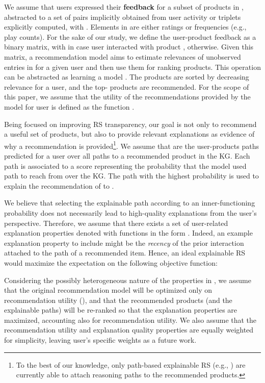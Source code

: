 \documentclass[sigconf]{acmart}
\begin{document}
We assume that users  expressed their \textbf{feedback} for a subset of products in , abstracted to a set of  pairs implicitly obtained from user activity or  triplets explicitly computed, with . 
Elements in  are either ratings or frequencies (e.g., play counts). 
For the sake of our study, we define the user-product feedback  as a binary matrix, with  in case user  interacted with product ,  otherwise. 
Given this matrix, a recommendation model aims to estimate relevances  of unobserved entries in  for a given user and then use them for ranking products. 
This operation can be abstracted as learning a model . 
The products are sorted by decreasing relevance for a user, and the top- products  are recommended.  
For the scope of this paper, we assume that the utility of the recommendations provided by the model for user  is defined as the function . 

Being focused on improving RS transparency, our goal is not only to recommend a useful set of products, but also to provide relevant explanations as evidence of why a recommendation is provided\footnote{To the best of our knowledge, only path-based explainable RS (e.g., \cite{XianFMMZ19}) are currently able to attach reasoning paths to the recommended products.}.
We assume that  are the user-products paths predicted for a user  over all paths to a recommended product  in the KG.  
Each path  is associated to a score  representing the probability that the model used path  to reach  from  over the KG. 
The path  with the highest probability  is used to explain the recommendation of  to .

We believe that selecting the explainable path  according to an inner-functioning probability does not necessarily lead to high-quality explanations from the user's perspective.
Therefore, we assume that there exists a set  of user-related explanation properties denoted with functions in the form .
Indeed, an example explanation property to include might be the \emph{recency} of the prior interaction attached to the path of a recommended item. 
Hence, an ideal explainable RS  would maximize the expectation on the following objective function:

\vspace{-2mm}


Considering the possibly heterogeneous nature of the properties in , we assume that the original recommendation model will be optimized only on recommendation utility (), and that the recommended products (and the explainable paths) will be re-ranked so that the explanation properties are maximized, accounting also for recommendation utility. We also assume that the recommendation utility and explanation quality properties are equally weighted for simplicity, leaving user's specific weights as a future work.   
\end{document}
